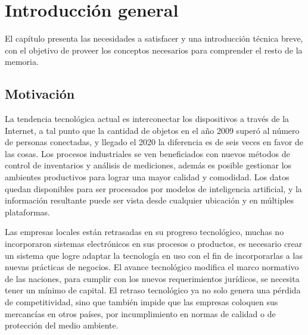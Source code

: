 
\chapter{Introducción general} %

\label{Chapter1} %
\label{IntroGeneral}


\newcommand{\keyword}[1]{\textbf{#1}}
\newcommand{\tabhead}[1]{\textbf{#1}}
\newcommand{\code}[1]{\texttt{#1}}
\newcommand{\file}[1]{\texttt{\bfseries#1}}
\newcommand{\option}[1]{\texttt{\itshape#1}}
\newcommand{\grados}{$^{\circ}$}



El capítulo presenta las necesidades a satisfacer y una introducción técnica breve, con el objetivo de proveer los conceptos necesarios para comprender el resto de la memoria.

\section{Motivación}
\label{ch1Motivacion}

La tendencia tecnológica actual es interconectar los dispositivos a través de la Internet, a tal punto que la cantidad de objetos en el año 2009 superó al número de personas conectadas, y llegado el 2020 la diferencia es de seis veces en favor de las cosas. \citep{ARTICLE:DaveEvans}
Los procesos industriales se ven beneficiados con nuevos métodos de control de inventarios y análisis de mediciones, además es posible gestionar los ambientes productivos para lograr una mayor calidad y comodidad.
Los datos quedan disponibles para ser procesados por modelos de inteligencia artificial, y la información resultante puede ser vista desde cualquier ubicación y en múltiples plataformas. 

Las empresas locales están retrasadas en su progreso tecnológico, muchas no incorporaron sistemas electrónicos en sus procesos o productos, es necesario crear un sistema que logre adaptar la tecnología en uso con el fin de incorporarlas a las nuevas prácticas de negocios.
El avance tecnológico modifica el marco normativo de las naciones, para cumplir con los nuevos requerimientos jurídicos, se necesita tener un mínimo de capital.
El retraso tecnológico ya no solo genera una pérdida de competitividad, sino que también impide que las empresas coloquen sus mercancías en otros países, por incumplimiento en normas de calidad o de protección del medio ambiente.
		
